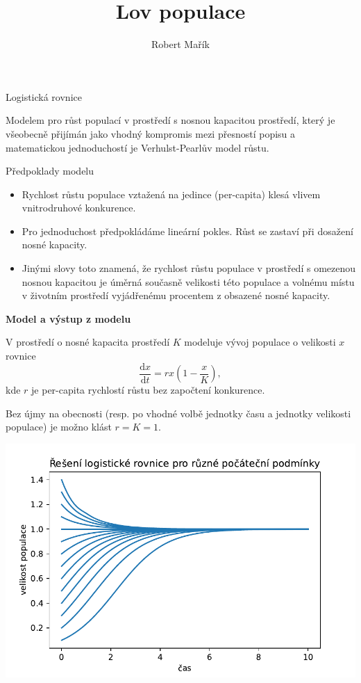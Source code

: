 \documentclass[handouts]{beamer}
\title{Lov populace}
\author{Robert Mařík}
\def\subsection#1{\par {\bfseries #1}\par\smallskip}
\begin{document}
\begin{frame}

  \begin{center}
    \large Logistická rovnice
  \end{center}


Modelem pro růst populací v prostředí s nosnou kapacitou prostředí, který je
všeobecně přijímán jako vhodný kompromis mezi přesností popisu a matematickou
jednoduchostí je Verhulst-Pearlův model růstu.



\begin{block}{Předpoklady modelu}
\begin{itemize}
\item Rychlost růstu populace vztažená na jedince (per-capita) klesá
  vlivem vnitrodruhové konkurence.  
\item Pro jednoduchost předpokládáme
  lineární pokles. Růst se zastaví při dosažení nosné kapacity.  
\item 
  Jinými slovy toto znamená, že rychlost růstu populace v prostředí s
  omezenou nosnou kapacitou je úměrná současně velikosti této populace
  a volnému místu v životním prostředí vyjádřenému procentem z
  obsazené nosné kapacity.
\end{itemize}
\end{block}

\subsection{Model a výstup z modelu}


\begin{minipage}[t]{0.4\linewidth}
V prostředí o nosné kapacita prostředí $K$ modeluje vývoj populace o
velikosti $x$ rovnice
$$\frac{\mathrm dx}{\mathrm dt}=rx\left(1-\frac xK\right),$$ kde $r$
je per-capita rychlostí růstu bez započtení konkurence.

Bez újmy na obecnosti (resp. po vhodné volbě jednotky času a jednotky
velikosti populace) je možno klást $r=K=1$.
\end{minipage}\begin{minipage}[t]{0.6\linewidth}
  \vspace*{-20pt}
  \includegraphics[width=\linewidth]{logisticka.pdf}
\end{minipage}


\end{frame}
\end{document}
